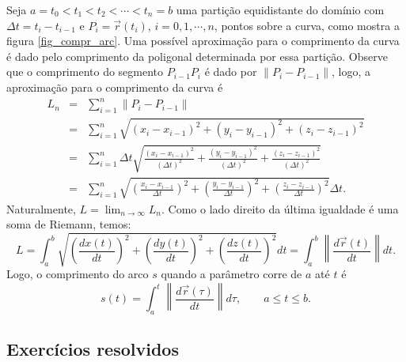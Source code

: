 Seja $a=t_0<t_1<t_2<\cdots<t_n=b $ uma partição equidistante do domínio com $\Delta t=t_i-t_{i-1}$ e $P_i=\vec{r}(t_i)$, $i=0,1,\cdots,n$, pontos sobre a curva, como mostra a figura \ref{fig_compr_arc}. Uma possível aproximação para o comprimento da curva é dado pelo comprimento da poligonal determinada por essa partição. Observe que o comprimento do segmento $P_{i-1}P_i$ é dado por $\|P_i-P_{i-1}\|$, logo, a aproximação para o comprimento da curva é
\begin{eqnarray*}
L_n&=&\sum_{i=1}^n\|P_i-P_{i-1}\|\\
&=&\sum_{i=1}^n \sqrt{(x_i-x_{i-1})^2+(y_i-y_{i-1})^2+(z_i-z_{i-1})^2}\\
&=&\sum_{i=1}^n \Delta t \sqrt{\frac{(x_i-x_{i-1})^2}{(\Delta t) ^2}+\frac{(y_i-y_{i-1})^2}{(\Delta t) ^2}+\frac{(z_i-z_{i-1})^2}{(\Delta t) ^2}}\\
&=&\sum_{i=1}^n \sqrt{\left(\frac{x_i-x_{i-1}}{\Delta t }\right)^2+\left(\frac{y_i-y_{i-1}}{\Delta t}\right)^2+\left(\frac{z_i-z_{i-1}}{\Delta t}\right)^2}\Delta t.
\end{eqnarray*}
Naturalmente, $L=\lim_{n\to\infty }L_n$. Como o lado direito da última igualdade é uma soma de Riemann, temos:
\begin{equation}\label{defcomparco}
L=\int_{a}^{b} \sqrt{\left(\frac{dx(t)}{dt}\right)^2+\left(\frac{dy(t)}{dt}\right)^2+\left(\frac{dz(t)}{dt}\right)^2}dt=\int_{a}^{b}\left\|\frac{d\vec{r}(t)}{dt}\right\|dt.
\end{equation}
Logo, o comprimento do arco $s$ quando a parâmetro corre de $a$ até $t$ é
\begin{equation}\label{defcomparco_1}
s(t)=\int_{a}^{t}\left\|\frac{d\vec{r}(\tau)}{dt}\right\|d\tau,\qquad a\leq t\leq b.
\end{equation}

\subsection*{Exercícios resolvidos}

